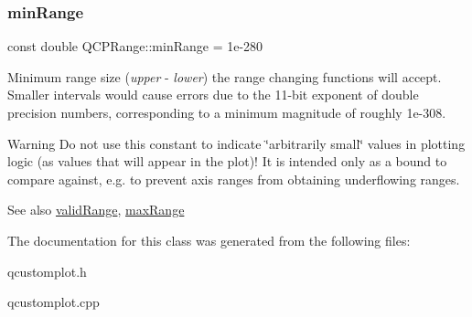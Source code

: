 \subsubsection{\texorpdfstring{min\+Range}{minRange}}
{\footnotesize\ttfamily const double Q\+C\+P\+Range\+::min\+Range = 1e-\/280\hspace{0.3cm}{\ttfamily [static]}}

Minimum range size ({\itshape upper} -\/ {\itshape lower}) the range changing functions will accept. Smaller intervals would cause errors due to the 11-\/bit exponent of double precision numbers, corresponding to a minimum magnitude of roughly 1e-\/308.

\begin{DoxyWarning}{Warning}
Do not use this constant to indicate \char`\"{}arbitrarily small\char`\"{} values in plotting logic (as values that will appear in the plot)! It is intended only as a bound to compare against, e.\+g. to prevent axis ranges from obtaining underflowing ranges.
\end{DoxyWarning}
\begin{DoxySeeAlso}{See also}
\hyperlink{classQCPRange_ab38bd4841c77c7bb86c9eea0f142dcc0}{valid\+Range}, \hyperlink{classQCPRange_a5ca51e7a2dc5dc0d49527ab171fe1f4f}{max\+Range} 
\end{DoxySeeAlso}


The documentation for this class was generated from the following files\+:\begin{DoxyCompactItemize}
\item 
qcustomplot.\+h\item 
qcustomplot.\+cpp\end{DoxyCompactItemize}
